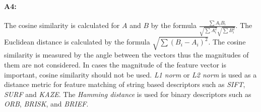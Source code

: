 \paragraph{A4:} The cosine similarity is calculated for $A$ and $B$ by the formula $\frac{\sum{A_iB_i}}{{\sqrt{\sum{A_i^2}}}{\sqrt{\sum{B_i^2}}}}$. The Euclidean distance is calculated by the formula $\sqrt{\sum{(B_i-A_i)}^2}$. The cosine similarity is measured by the angle between the vectors thus the magnitudes of them are not considered. In cases the magnitude of the feature vector is important, cosine similarity should not be used. \emph{L1 norm} or \emph{L2 norm} is used as a distance metric for feature matching of string based descriptors such as \emph{SIFT}, \emph{SURF} and \emph{KAZE}. The \emph{Hamming distance} is used for binary descriptors such as \emph{ORB}, \emph{BRISK}, and \emph{BRIEF}.









